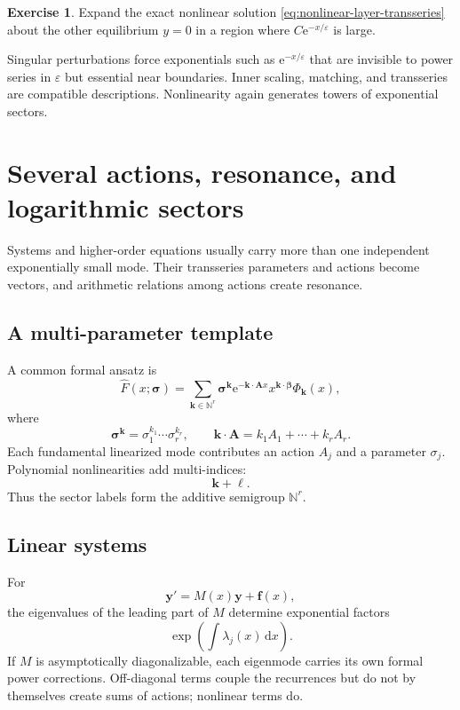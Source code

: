 \documentclass[11pt,openany]{book}
\theoremstyle{definition}
\newtheorem{exercise}{Exercise}[chapter]
\theoremstyle{plain}
\theoremstyle{remark}
\newcommand{\N}{\mathbb{N}}
\newcommand{\eps}{\varepsilon}
\newcommand{\dd}{\,\mathrm{d}}
\newcommand{\e}{\mathrm{e}}
\newcommand{\trans}[1]{\widehat{#1}}
\begin{document}
\begin{exercise}
Expand the exact nonlinear solution \cref{eq:nonlinear-layer-transseries} about the other equilibrium $y=0$ in a region where $C\e^{-x/\eps}$ is large.
\end{exercise}

\begin{summarybox}
Singular perturbations force exponentials such as $\e^{-x/\eps}$ that are invisible to power series in $\eps$ but essential near boundaries. Inner scaling, matching, and transseries are compatible descriptions. Nonlinearity again generates towers of exponential sectors.
\end{summarybox}


\chapter{Several actions, resonance, and logarithmic sectors}\label{ch:multi-parameter}

Systems and higher-order equations usually carry more than one independent exponentially small mode. Their transseries parameters and actions become vectors, and arithmetic relations among actions create resonance.

\section{A multi-parameter template}

A common formal ansatz is
\begin{equation}\label{eq:multi-template}
 \trans F(x;\boldsymbol\sigma)
 =\sum_{\mathbf k\in\N^r}
 \boldsymbol\sigma^{\mathbf k}
 \e^{-\mathbf k\cdot\mathbf A x}
 x^{\mathbf k\cdot\boldsymbol\beta}
 \Phi_{\mathbf k}(x),
\end{equation}
where
\[
 \boldsymbol\sigma^{\mathbf k}
 =\sigma_1^{k_1}\cdots\sigma_r^{k_r},
 \qquad
 \mathbf k\cdot\mathbf A
 =k_1A_1+\cdots+k_rA_r.
\]
Each fundamental linearized mode contributes an action $A_j$ and a parameter $\sigma_j$. Polynomial nonlinearities add multi-indices:
\[
 \mathbf k+\boldsymbol\ell.
\]
Thus the sector labels form the additive semigroup $\N^r$.

\section{Linear systems}

For
\[
 \mathbf y'=M(x)\mathbf y+\mathbf f(x),
\]
the eigenvalues of the leading part of $M$ determine exponential factors
\[
 \exp\left(\int\lambda_j(x)\dd x\right).
\]
If $M$ is asymptotically diagonalizable, each eigenmode carries its own formal power corrections. Off-diagonal terms couple the recurrences but do not by themselves create sums of actions; nonlinear terms do.
\end{document}
